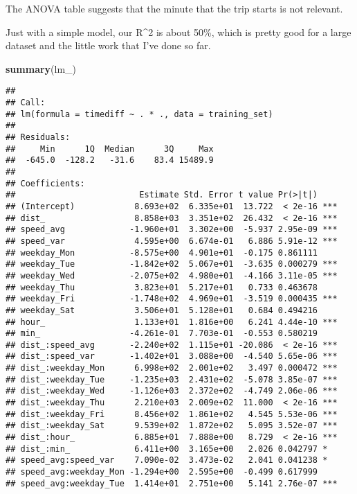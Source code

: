 \documentclass[]{article}
\newenvironment{Shaded}{\begin{snugshade}}{\end{snugshade}}
\newcommand{\KeywordTok}[1]{\textcolor[rgb]{0.13,0.29,0.53}{\textbf{#1}}}
\newcommand{\NormalTok}[1]{#1}
\begin{document}
The ANOVA table suggests that the minute that the trip starts is not
relevant.

Just with a simple model, our R\^{}2 is about 50\%, which is pretty good
for a large dataset and the little work that I've done so far.

\begin{Shaded}
\begin{Highlighting}[]
\KeywordTok{summary}\NormalTok{(lm_)}
\end{Highlighting}
\end{Shaded}

\begin{verbatim}
## 
## Call:
## lm(formula = timediff ~ . * ., data = training_set)
## 
## Residuals:
##     Min      1Q  Median      3Q     Max 
##  -645.0  -128.2   -31.6    83.4 15489.9 
## 
## Coefficients:
##                         Estimate Std. Error t value Pr(>|t|)    
## (Intercept)            8.693e+02  6.335e+01  13.722  < 2e-16 ***
## dist_                  8.858e+03  3.351e+02  26.432  < 2e-16 ***
## speed_avg             -1.960e+01  3.302e+00  -5.937 2.95e-09 ***
## speed_var              4.595e+00  6.674e-01   6.886 5.91e-12 ***
## weekday_Mon           -8.575e+00  4.901e+01  -0.175 0.861111    
## weekday_Tue           -1.842e+02  5.067e+01  -3.635 0.000279 ***
## weekday_Wed           -2.075e+02  4.980e+01  -4.166 3.11e-05 ***
## weekday_Thu            3.823e+01  5.217e+01   0.733 0.463678    
## weekday_Fri           -1.748e+02  4.969e+01  -3.519 0.000435 ***
## weekday_Sat            3.506e+01  5.128e+01   0.684 0.494216    
## hour_                  1.133e+01  1.816e+00   6.241 4.44e-10 ***
## min_                  -4.261e-01  7.703e-01  -0.553 0.580219    
## dist_:speed_avg       -2.240e+02  1.115e+01 -20.086  < 2e-16 ***
## dist_:speed_var       -1.402e+01  3.088e+00  -4.540 5.65e-06 ***
## dist_:weekday_Mon      6.998e+02  2.001e+02   3.497 0.000472 ***
## dist_:weekday_Tue     -1.235e+03  2.431e+02  -5.078 3.85e-07 ***
## dist_:weekday_Wed     -1.126e+03  2.372e+02  -4.749 2.06e-06 ***
## dist_:weekday_Thu      2.210e+03  2.009e+02  11.000  < 2e-16 ***
## dist_:weekday_Fri      8.456e+02  1.861e+02   4.545 5.53e-06 ***
## dist_:weekday_Sat      9.539e+02  1.872e+02   5.095 3.52e-07 ***
## dist_:hour_            6.885e+01  7.888e+00   8.729  < 2e-16 ***
## dist_:min_             6.411e+00  3.165e+00   2.026 0.042797 *  
## speed_avg:speed_var    7.090e-02  3.473e-02   2.041 0.041238 *  
## speed_avg:weekday_Mon -1.294e+00  2.595e+00  -0.499 0.617999    
## speed_avg:weekday_Tue  1.414e+01  2.751e+00   5.141 2.76e-07 ***

\end{verbatim}
\end{document}
